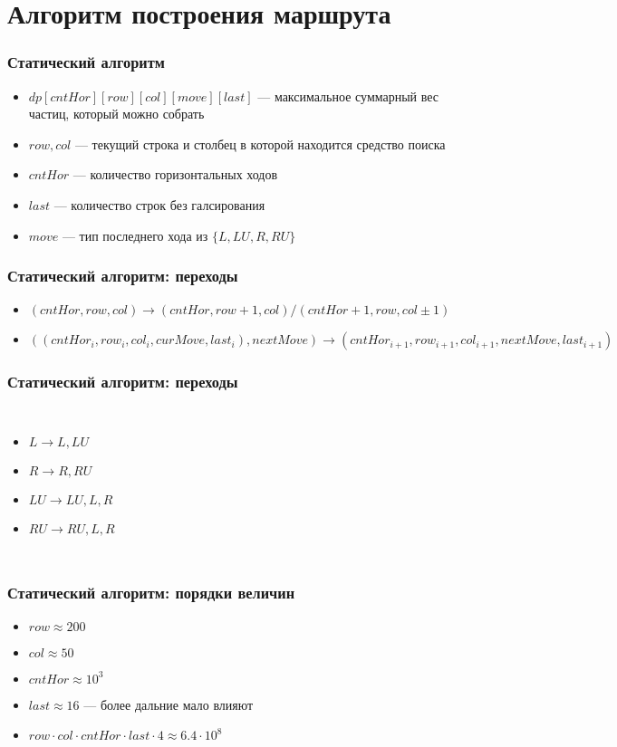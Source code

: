 \documentclass{beamer} %
\theoremstyle{definition} %
\begin{document}
\section{Алгоритм построения маршрута}
\begin{frame}
\frametitle{Статический алгоритм}
\begin{itemize}
\item{$dp[cntHor][row][col][move][last]$ --- максимальное суммарный вес частиц, который можно собрать}
\item{$row, col$ --- текущий строка и столбец в которой находится средство поиска}
\item{$cntHor$ --- количество горизонтальных ходов}
\item{$last$ --- количество строк без галсирования}
\item{$move$ --- тип последнего хода из $\{L, LU, R, RU\}$} 

\end{itemize}
\end{frame}

\begin{frame}
\frametitle{Статический алгоритм: переходы}
\begin{itemize}
\item{$(cntHor, row, col) \to (cntHor, row+1, col)/(cntHor+1,row, col \pm 1)$}
\\
\item{$((cntHor_i, row_i, col_i, curMove, last_i), nextMove) \to 
(cntHor_{i+1}, row_{i+1}, col_{i+1}, nextMove, last_{i+1})$}
\end{itemize}
\end{frame}

\begin{frame}
  \frametitle{Статический алгоритм: переходы}
\begin{columns}
\begin{itemize}
\item{$L \to L, LU$}
\item{$R \to R, RU$}
\item{$LU \to LU, L, R$}
\item{$RU \to RU, L, R$}
\end{itemize}
\end{columns}
\end{frame}

\begin{frame}
\frametitle{Статический алгоритм: порядки величин}
\begin{itemize}
\item{$row \approx 200$}
\item{$col \approx 50$}
\item{$cntHor \approx 10^3$}
\item{$last \approx 16$ --- более дальние мало влияют}
\item{$row \cdot col \cdot cntHor \cdot last \cdot 4 \approx 6.4 \cdot 10^8$}
\end{itemize}
\end{frame}
\end{document}
